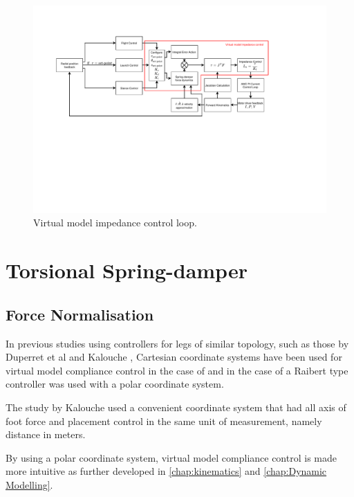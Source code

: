 \begin{figure}
\centering
\includegraphics[clip, trim=2cm 8cm 5cm 3cm, page = 1, width=1\textwidth]{images/control/virtual-model-impedance.pdf} 
\caption{Virtual model impedance control loop.}
\label{fig:virtual-model-impedance-loop}
\end{figure}

\section{Torsional Spring-damper}
\label{sec:Torsional Spring-damper}

\subsection{Force Normalisation}

In previous studies using controllers for legs of similar topology, such as those by Duperret et al \cite{Duperret} and Kalouche \cite{Kalouche2016}, Cartesian coordinate systems have been used for virtual model compliance control in the case of \cite{Kalouche2016} and in the case of \cite{Duperret} a Raibert type controller was used with a polar coordinate system.

The study by Kalouche \cite{Kalouche2016} used a convenient coordinate system that had all axis of foot force and placement control in the same unit of measurement, namely distance in meters. 

By using a polar coordinate system, virtual model compliance control is made more intuitive as further developed in \cref{chap:kinematics} and \cref{chap:Dynamic Modelling}. 

